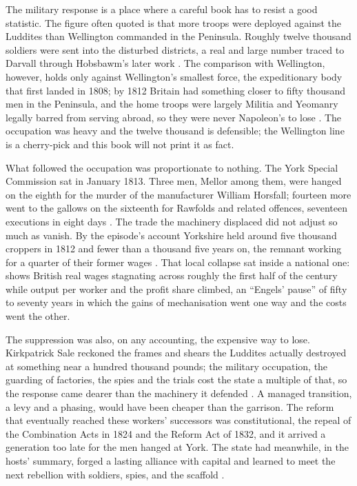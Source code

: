 The military response is a place where a careful book has to resist a good statistic. The figure often quoted is that more troops were deployed against the Luddites than Wellington commanded in the Peninsula. Roughly twelve thousand soldiers were sent into the disturbed districts, a real and large number traced to Darvall through Hobsbawm's later work \parencite{Darvall1934,Hobsbawm1964}. The comparison with Wellington, however, holds only against Wellington's smallest force, the expeditionary body that first landed in 1808; by 1812 Britain had something closer to fifty thousand men in the Peninsula, and the home troops were largely Militia and Yeomanry legally barred from serving abroad, so they were never Napoleon's to lose \parencite{Howes2017,Linch2011}. The occupation was heavy and the twelve thousand is defensible; the Wellington line is a cherry-pick and this book will not print it as fact.

What followed the occupation was proportionate to nothing. The York Special Commission sat in January 1813. Three men, Mellor among them, were hanged on the eighth for the murder of the manufacturer William Horsfall; fourteen more went to the gallows on the sixteenth for Rawfolds and related offences, seventeen executions in eight days \parencite{YorkProceedings1813,Thompson1963}. The trade the machinery displaced did not adjust so much as vanish. By the episode's account Yorkshire held around five thousand croppers in 1812 and fewer than a thousand five years on, the remnant working for a quarter of their former wages \parencite{LynskeyDunt2026Luddites}. That local collapse sat inside a national one: \textcite{Allen2009} shows British real wages stagnating across roughly the first half of the century while output per worker and the profit share climbed, an ``Engels' pause'' of fifty to seventy years in which the gains of mechanisation went one way and the costs went the other.

The suppression was also, on any accounting, the expensive way to lose. Kirkpatrick Sale reckoned the frames and shears the Luddites actually destroyed at something near a hundred thousand pounds; the military occupation, the guarding of factories, the spies and the trials cost the state a multiple of that, so the response came dearer than the machinery it defended \parencite{LynskeyDunt2026Luddites}. A managed transition, a levy and a phasing, would have been cheaper than the garrison. The reform that eventually reached these workers' successors was constitutional, the repeal of the Combination Acts in 1824 and the Reform Act of 1832, and it arrived a generation too late for the men hanged at York. The state had meanwhile, in the hosts' summary, forged a lasting alliance with capital and learned to meet the next rebellion with soldiers, spies, and the scaffold \parencite{LynskeyDunt2026Luddites}.

